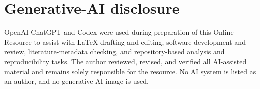 \documentclass[pdflatex,sn-mathphys-ay]{sn-jnl}
\numberwithin{equation}{section}
\theoremstyle{definition}
\theoremstyle{plain}
\begin{document}
\section*{Generative-AI disclosure}
OpenAI ChatGPT and Codex were used during preparation of this Online Resource
to assist with LaTeX drafting and editing, software development and review,
literature-metadata checking, and repository-based analysis and reproducibility
tasks. The author reviewed, revised, and verified all AI-assisted material and
remains solely responsible for the resource. No AI system is listed as an
author, and no generative-AI image is used.


\end{document}
